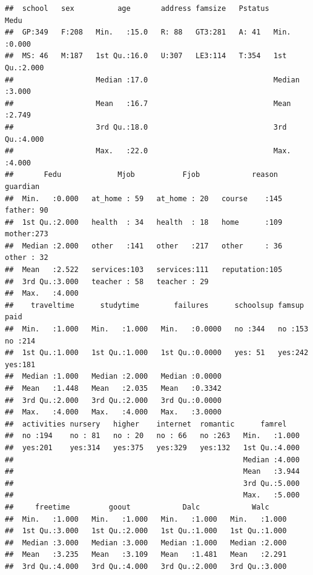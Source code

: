 \documentclass[
]{article}
\begin{document}
\begin{verbatim}
##  school   sex          age       address famsize   Pstatus      Medu      
##  GP:349   F:208   Min.   :15.0   R: 88   GT3:281   A: 41   Min.   :0.000  
##  MS: 46   M:187   1st Qu.:16.0   U:307   LE3:114   T:354   1st Qu.:2.000  
##                   Median :17.0                             Median :3.000  
##                   Mean   :16.7                             Mean   :2.749  
##                   3rd Qu.:18.0                             3rd Qu.:4.000  
##                   Max.   :22.0                             Max.   :4.000  
##       Fedu             Mjob           Fjob            reason      guardian  
##  Min.   :0.000   at_home : 59   at_home : 20   course    :145   father: 90  
##  1st Qu.:2.000   health  : 34   health  : 18   home      :109   mother:273  
##  Median :2.000   other   :141   other   :217   other     : 36   other : 32  
##  Mean   :2.522   services:103   services:111   reputation:105               
##  3rd Qu.:3.000   teacher : 58   teacher : 29                                
##  Max.   :4.000                                                              
##    traveltime      studytime        failures      schoolsup famsup     paid    
##  Min.   :1.000   Min.   :1.000   Min.   :0.0000   no :344   no :153   no :214  
##  1st Qu.:1.000   1st Qu.:1.000   1st Qu.:0.0000   yes: 51   yes:242   yes:181  
##  Median :1.000   Median :2.000   Median :0.0000                                
##  Mean   :1.448   Mean   :2.035   Mean   :0.3342                                
##  3rd Qu.:2.000   3rd Qu.:2.000   3rd Qu.:0.0000                                
##  Max.   :4.000   Max.   :4.000   Max.   :3.0000                                
##  activities nursery   higher    internet  romantic      famrel     
##  no :194    no : 81   no : 20   no : 66   no :263   Min.   :1.000  
##  yes:201    yes:314   yes:375   yes:329   yes:132   1st Qu.:4.000  
##                                                     Median :4.000  
##                                                     Mean   :3.944  
##                                                     3rd Qu.:5.000  
##                                                     Max.   :5.000  
##     freetime         goout            Dalc            Walc      
##  Min.   :1.000   Min.   :1.000   Min.   :1.000   Min.   :1.000  
##  1st Qu.:3.000   1st Qu.:2.000   1st Qu.:1.000   1st Qu.:1.000  
##  Median :3.000   Median :3.000   Median :1.000   Median :2.000  
##  Mean   :3.235   Mean   :3.109   Mean   :1.481   Mean   :2.291  
##  3rd Qu.:4.000   3rd Qu.:4.000   3rd Qu.:2.000   3rd Qu.:3.000  

\end{verbatim}
\end{document}
